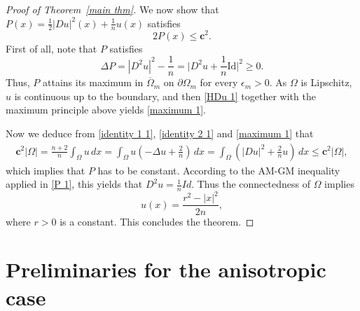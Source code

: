 \documentclass[reqno,11pt]{amsart}
\def\ez{\epsilon}
\numberwithin{equation}{section}
\theoremstyle{remark}
\begin{document}
\begin{proof}[Proof of Theorem~\ref{main thm}]
We now show that $P(x)=  \frac 1 2|Du|^2(x) +\frac{1}{n}u(x)$ satisfies 
\begin{equation}\label{maximum 1}
    2P(x)\le \mathbf{c}^2. 
\end{equation}
First of all, note that $P$ satisfies
\begin{equation}\label{P 1}
\Delta P = |D^2 u|^2 - \frac 1 n=\biggl|{D^2u}+\frac{1}{n}\textrm{Id}\biggr|^2\ge 0.
    \end{equation}
Thus, $P$ attains its maximum in $\overline{\Omega}_m$ on $\partial\Omega_m$ for every $\ez_m>0$. 
As $\Omega$ is Lipschitz, $u$ is continuous up to the boundary, and  then \eqref{HDu 1} together with the maximum principle above yields \eqref{maximum 1}.  

 

Now we deduce from \eqref{identity 1 1}, \eqref{identity 2 1} and \eqref{maximum 1} that
\begin{align*}
   \mathbf{c}^2|\Omega|   = \frac{n+2}{n} \int_{\Omega} u\,dx =   \int_{\Omega} u\left(-\Delta u+\frac{2}{n}\right)\,dx=\int_{\Omega} \left(|Du|^2+\frac{2}{n} u \right)\,dx\le \mathbf{c}^2|\Omega|,
\end{align*}
which implies that $P$ has to be constant. According to the AM-GM inequality applied in \eqref{P 1}, this yields that   
$D^2u=\frac 1 n Id$.  
Thus the connectedness of $\Omega$ implies
$$u(x)=\frac{r^2-|x|^2}{2n},$$
where  $r>0$ is a constant. This concludes the theorem. 
\end{proof}


\section{Preliminaries for the anisotropic case}
\end{document}
